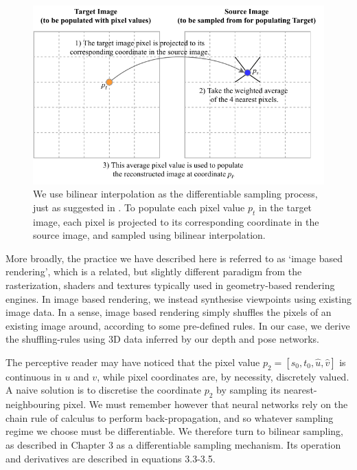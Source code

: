 \begin{figure}[h]
    \centering
    \includegraphics[width=\textwidth]{images/interp.pdf}
    \caption[How bilinear interpolation is used to populate a target image]{We use bilinear interpolation as the differentiable sampling process, just as suggested in \cite{zhou2017unsupervised}. To populate each pixel value $p_t$ in the target image, each pixel is projected to its corresponding coordinate in the source image, and sampled using bilinear interpolation.}
\end{figure}

More broadly, the practice we have described here is referred to as `image based rendering', which is a related, but slightly different paradigm from the rasterization, shaders and textures typically used in geometry-based rendering engines. In image based rendering, we instead synthesise viewpoints using existing image data. In a sense, image based rendering simply shuffles the pixels of an existing image around, according to some pre-defined rules. In our case, we derive the shuffling-rules using 3D data inferred by our depth and pose networks. 

The perceptive reader may have noticed that the pixel value $p_2 = [s_0, t_0, \hat{u}, \hat{v}]$ is continuous in $u$ and $v$, while pixel coordinates are, by necessity, discretely valued. A naive solution is to discretise the coordinate $p_2$ by sampling its nearest-neighbouring pixel. We must remember however that neural networks rely on the chain rule of calculus to perform back-propagation, and so whatever sampling regime we choose must be differentiable. We therefore turn to bilinear sampling, as described in Chapter 3 as a differentiable sampling mechanism. Its operation and derivatives are described in equations 3.3-3.5.

